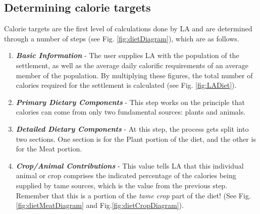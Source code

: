 \subsection{Determining calorie targets}
  Calorie targets are the first level of calculations done by LA and are
  determined through a number of steps (see Fig.  \ref{fig:dietDiagram}), which
  are as follows.
    \begin{enumerate}
      \item \textbf{\textit{Basic Information}} - The user supplies LA with the
        population of the settlement, as well as the average daily calorific
        requirements of an average member of the population.  By multiplying
        these figures, the total number of calories required for the
        settlement is calculated (see Fig. \ref{fig:LADiet}).
      \item \textbf{\textit{Primary Dietary Components}} - This step works on
        the principle that calories can come from only two fundamental sources:
        plants and animals.
      \item \textbf{\textit{Detailed Dietary Components}} - At this step, the
        process gets split into two sections.  One section is for the Plant
        portion of the diet, and the other is for the Meat portion.
      \item \textbf{\textit{Crop/Animal Contributions}} - This value tells LA
        that this individual animal or crop comprises the indicated percentage of
        the calories being supplied by tame sources, which is the value from the
        previous step. Remember that this is a portion of the \textit{tame crop}
        part of the diet! 
        (See Fig. \ref{fig:dietMeatDiagram} and Fig.\ref{fig:dietCropDiagram}).
    \end{enumerate}

